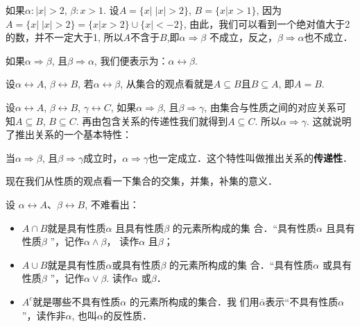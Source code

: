 如果$\alpha :|x|>2$, $\beta :x>1$. 设$A=\{x|\; |x|>2\}$, $B=\{ x| x>1\}$, 因为$A=\{ x|\; |x|>2\}=\{x|x>2\}\cup\{x|<-2\}$, 由此，我们可以看到一个绝对值大于2
的数，并不一定大于1, 所以$A$不含于$B$,即$\alpha \Rightarrow\beta$ 不成立，反之，$\beta \Rightarrow \alpha$也不成立．

如果$\alpha \Rightarrow\beta$, 且$\beta \Rightarrow\alpha$, 我们便表示为：$\alpha\longleftrightarrow \beta$.

设$\alpha \longleftrightarrow A$, $\beta \longleftrightarrow B$, 若$\alpha \longleftrightarrow\beta$, 从集合的观点看就是$A\subseteq B$且$B\subseteq A$, 即$A=B$.

设$\alpha \longleftrightarrow A$, $\beta \longleftrightarrow B$, $\gamma\longleftrightarrow C$, 如果$\alpha \Rightarrow\beta$, 且$\beta \Rightarrow\gamma$, 由集合与性质之间的对应关系可知$A\subseteq B$, $B\subseteq C$. 再由包含关系的传递性我们就得到$A\subseteq C$. 所以$\alpha \Rightarrow\gamma$. 这就说明了推出关系的一个基本特性：

当$\alpha \Rightarrow\beta$, 且$\beta \Rightarrow\gamma$成立时，$\alpha \Rightarrow\gamma$也一定成立．这个特性叫做推出关系的\textbf{传递性}．

现在我们从性质的观点看一下集合的交集，并集，补集的意义．

设 $\alpha \longleftrightarrow A$、$\beta\longleftrightarrow B$, 不难看出：
\begin{itemize}
	\item $A\cap B$就是具有性质$\alpha$ 且具有性质$\beta$ 的元素所构成的集
	合．“具有性质$\alpha$ 且具有性质$\beta$ ”，记作$\alpha \wedge\beta$， 读作$\alpha$ 且$\beta$；
	\item  $A\cup B$就是具有性质$\alpha$或具有性质$\beta$ 的元素所构成的集
	合．“具有性质$\alpha$ 或具有性质$\beta$ ”，记作$\alpha \vee\beta$. 读作$\alpha$ 或$\beta$． 
	\item $A^c$就是哪些不具有性质$\alpha$ 的元素所构成的集合．我
	们用$\bar{\alpha}$表示“不具有性质$\alpha$”，读作非$\alpha$, 也叫$\alpha$的反性质．
\end{itemize}

\begin{figure}[htp]
	\centering
	\caption{}
\end{figure}

